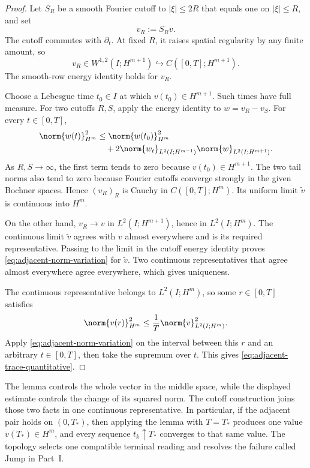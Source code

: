 \begin{proof}
Let \(S_R\) be a smooth Fourier cutoff to \(|\xi|\le2R\) that equals one on
\(|\xi|\le R\), and set
\begin{equation*}
 v_R:=S_Rv.
\end{equation*}
The cutoff commutes with \(\partial_t\).  At fixed \(R\), it raises spatial
regularity by any finite amount, so
\begin{equation*}
 v_R\in W^{1,2}(I;H^{m+1})
 \hookrightarrow C([0,T];H^{m+1}).
\end{equation*}
The smooth-row energy identity holds for \(v_R\).

Choose a Lebesgue time \(t_0\in I\) at which
\(v(t_0)\in H^{m+1}\).  Such times have full measure.  For two cutoffs
\(R,S\), apply the energy identity to
\(w=v_R-v_S\).  For every \(t\in[0,T]\),
\begin{align*}
 \norm{w(t)}_{H^m}^2
 &\le\norm{w(t_0)}_{H^m}^2
 \\
 &\quad+2
 \norm{w_t}_{L^2(I;H^{m-1})}
 \norm{w}_{L^2(I;H^{m+1})}.
\end{align*}
As \(R,S\to\infty\), the first term tends to zero because
\(v(t_0)\in H^{m+1}\).  The two tail norms also tend to zero because Fourier
cutoffs converge strongly in the given Bochner spaces.  Hence
\((v_R)_R\) is Cauchy in \(C([0,T];H^m)\).  Its uniform limit
\(\widetilde v\) is continuous into \(H^m\).

On the other hand, \(v_R\to v\) in
\(L^2(I;H^{m+1})\), hence in \(L^2(I;H^m)\).  The continuous limit
\(\widetilde v\) agrees with \(v\) almost everywhere and is its required
representative.  Passing to the limit in the cutoff energy identity proves
\eqref{eq:adjacent-norm-variation} for \(\widetilde v\).  Two continuous
representatives that agree almost everywhere agree everywhere, which gives
uniqueness.

The continuous representative belongs to \(L^2(I;H^m)\), so some
\(r\in[0,T]\) satisfies
\[
 \norm{v(r)}_{H^m}^2
 \le \frac1T\norm{v}_{L^2(I;H^m)}^2.
\]
Apply \eqref{eq:adjacent-norm-variation} on the interval between this \(r\)
and an arbitrary \(t\in[0,T]\), then take the supremum over \(t\).  This gives
\eqref{eq:adjacent-trace-quantitative}.
\end{proof}

The lemma controls the whole vector in the middle space, while the displayed
estimate controls the change of its squared norm.  The cutoff construction
joins those two facts in one continuous representative.  In particular, if
the adjacent pair holds on \((0,T_*)\), then applying the lemma with
\(T=T_*\) produces one value \(v(T_*)\in H^m\), and every sequence
\(t_k\uparrow T_*\) converges to that same value.  The topology
selects one compatible terminal reading and resolves the failure called Jump
in Part~I.

